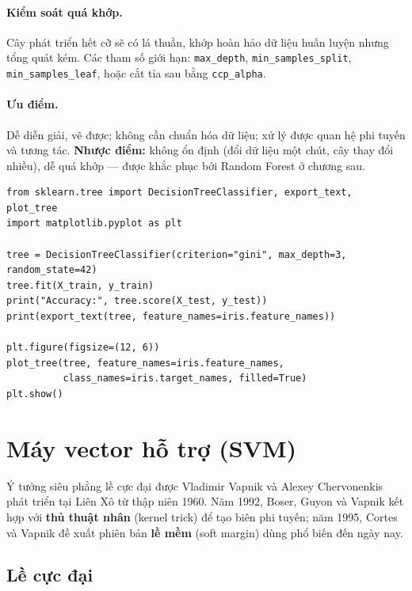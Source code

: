 \paragraph{Kiểm soát quá khớp.} Cây phát triển hết cỡ sẽ có lá thuần, khớp hoàn hảo dữ liệu huấn luyện nhưng tổng quát kém. Các tham số giới hạn: \texttt{max\_depth}, \texttt{min\_samples\_split}, \texttt{min\_samples\_leaf}, hoặc cắt tỉa sau bằng \texttt{ccp\_alpha}.

\paragraph{Ưu điểm.} Dễ diễn giải, vẽ được; không cần chuẩn hóa dữ liệu; xử lý được quan hệ phi tuyến và tương tác. \textbf{Nhược điểm:} không ổn định (đổi dữ liệu một chút, cây thay đổi nhiều), dễ quá khớp --- được khắc phục bởi Random Forest ở chương sau.

\begin{lstlisting}[caption={Cây quyết định và trực quan hóa}]
from sklearn.tree import DecisionTreeClassifier, export_text, plot_tree
import matplotlib.pyplot as plt

tree = DecisionTreeClassifier(criterion="gini", max_depth=3, random_state=42)
tree.fit(X_train, y_train)
print("Accuracy:", tree.score(X_test, y_test))
print(export_text(tree, feature_names=iris.feature_names))

plt.figure(figsize=(12, 6))
plot_tree(tree, feature_names=iris.feature_names,
          class_names=iris.target_names, filled=True)
plt.show()
\end{lstlisting}


\section{Máy vector hỗ trợ (SVM)}

Ý tưởng siêu phẳng lề cực đại được Vladimir Vapnik và Alexey Chervonenkis phát triển tại Liên Xô từ thập niên 1960. Năm 1992, Boser, Guyon và Vapnik kết hợp với \textbf{thủ thuật nhân} (kernel trick) để tạo biên phi tuyến; năm 1995, Cortes và Vapnik đề xuất phiên bản \textbf{lề mềm} (soft margin) dùng phổ biến đến ngày nay.

\subsection{Lề cực đại}

